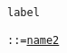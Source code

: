 
\begin{alltt}
\hypertarget{labelP\newLinkVer}{label} ::= \hyperlink{name2P\linkVer}{name2}
\end{alltt}
